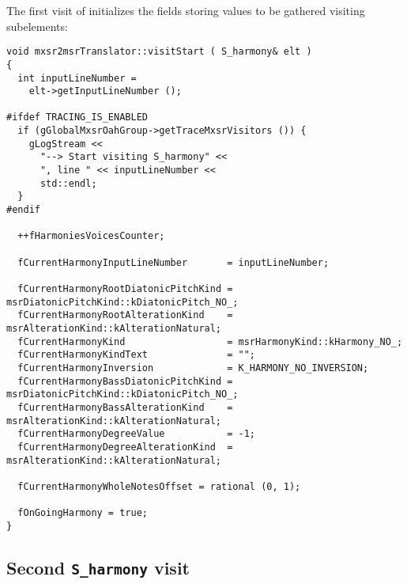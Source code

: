 The first visit of  initializes the fields storing values to be gathered visiting subelements:
\begin{lstlisting}[language=CPlusPlus]
void mxsr2msrTranslator::visitStart ( S_harmony& elt )
{
  int inputLineNumber =
    elt->getInputLineNumber ();

#ifdef TRACING_IS_ENABLED
  if (gGlobalMxsrOahGroup->getTraceMxsrVisitors ()) {
    gLogStream <<
      "--> Start visiting S_harmony" <<
      ", line " << inputLineNumber <<
      std::endl;
  }
#endif

  ++fHarmoniesVoicesCounter;

  fCurrentHarmonyInputLineNumber       = inputLineNumber;

  fCurrentHarmonyRootDiatonicPitchKind = msrDiatonicPitchKind::kDiatonicPitch_NO_;
  fCurrentHarmonyRootAlterationKind    = msrAlterationKind::kAlterationNatural;
  fCurrentHarmonyKind                  = msrHarmonyKind::kHarmony_NO_;
  fCurrentHarmonyKindText              = "";
  fCurrentHarmonyInversion             = K_HARMONY_NO_INVERSION;
  fCurrentHarmonyBassDiatonicPitchKind = msrDiatonicPitchKind::kDiatonicPitch_NO_;
  fCurrentHarmonyBassAlterationKind    = msrAlterationKind::kAlterationNatural;
  fCurrentHarmonyDegreeValue           = -1;
  fCurrentHarmonyDegreeAlterationKind  = msrAlterationKind::kAlterationNatural;

  fCurrentHarmonyWholeNotesOffset = rational (0, 1);

  fOnGoingHarmony = true;
}
\end{lstlisting}


\subsection{Second {\tt S_harmony} visit}

